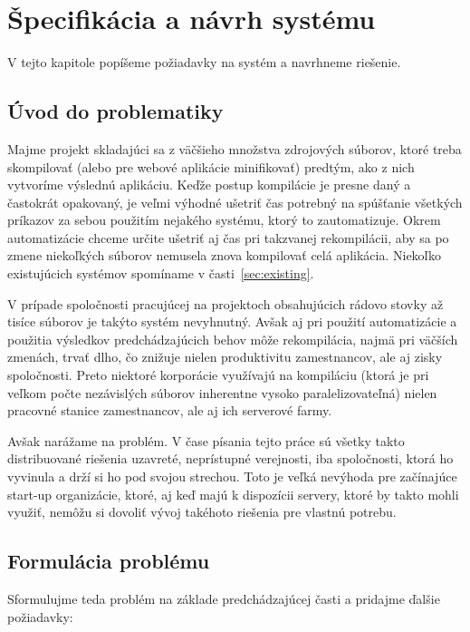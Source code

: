 \chapter{\v{S}pecifik\'{a}cia a n\'{a}vrh syst\'{e}mu}
\label{ch:spec}

V tejto kapitole popíšeme požiadavky na systém a navrhneme riešenie.

\section{\'{U}vod do problematiky}
\label{sec:intro}

Majme projekt skladajúci sa z väčšieho množstva zdrojových súborov, ktoré treba
skompilovať (alebo pre webové aplikácie minifikovať) predtým, ako z nich vytvoríme
výslednú aplikáciu. Keďže postup kompilácie je presne daný a častokrát opakovaný,
je veľmi výhodné ušetriť čas potrebný na spúšťanie všetkých príkazov za sebou
použitím nejakého systému, ktorý to zautomatizuje. Okrem automatizácie chceme
určite ušetriť aj čas pri takzvanej rekompilácii, aby sa po zmene niekoľkých súborov
nemusela znova kompilovať celá aplikácia. Niekoľko existujúcich systémov spomíname
v časti~\ref{sec:existing}.

V prípade spoločnosti pracujúcej na projektoch obsahujúcich rádovo stovky až tisíce
súborov je takýto systém nevyhnutný. Avšak aj pri použití automatizácie a použitia
výsledkov predchádzajúcich behov môže rekompilácia, najmä pri väčších zmenách,
trvať dlho, čo znižuje nielen produktivitu zamestnancov, ale aj zisky spoločnosti.
Preto niektoré korporácie využívajú na kompiláciu (ktorá je pri veľkom počte
nezávislých súborov inherentne vysoko paralelizovateľná) nielen pracovné stanice
zamestnancov, ale aj ich serverové farmy.

Avšak narážame na problém. V čase písania tejto práce sú všetky takto distribuované
riešenia uzavreté, neprístupné verejnosti, iba spoločnosti, ktorá ho vyvinula
a drží si ho pod svojou strechou. Toto je veľká nevýhoda pre začínajúce start-up
organizácie, ktoré, aj keď majú k dispozícii servery, ktoré by takto mohli využiť,
nemôžu si dovoliť vývoj takéhoto riešenia pre vlastnú potrebu.

\section{Formul\'{a}cia probl\'{e}mu}
\label{sec:problem}

Sformulujme teda problém na základe predchádzajúcej časti a pridajme ďalšie
požiadavky:

